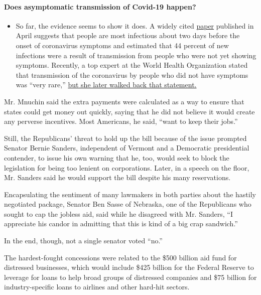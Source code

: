 \begin{itemize}
{  \paragraph{Does asymptomatic transmission of Covid-19
  happen?}\label{does-asymptomatic-transmission-of-covid-19-happen}}

  \begin{itemize}
  \tightlist
  \item
    So far, the evidence seems to show it does. A widely cited
    \href{https://www.nature.com/articles/s41591-020-0869-5}{paper}
    published in April suggests that people are most infectious about
    two days before the onset of coronavirus symptoms and estimated that
    44 percent of new infections were a result of transmission from
    people who were not yet showing symptoms. Recently, a top expert at
    the World Health Organization stated that transmission of the
    coronavirus by people who did not have symptoms was ``very rare,''
    \href{https://www.nytimes.com/2020/06/09/world/coronavirus-updates.html?action=click\&pgtype=Article\&state=default\&region=MAIN_CONTENT_3\&context=storylines_faq\#link-1f302e21}{but
    she later walked back that statement.}
  \end{itemize}
\end{itemize}

Mr. Mnuchin said the extra payments were calculated as a way to ensure
that states could get money out quickly, saying that he did not believe
it would create any perverse incentives. Most Americans, he said, ``want
to keep their jobs.''

Still, the Republicans' threat to hold up the bill because of the issue
prompted Senator Bernie Sanders, independent of Vermont and a Democratic
presidential contender, to issue his own warning that he, too, would
seek to block the legislation for being too lenient on corporations.
Later, in a speech on the floor, Mr. Sanders said he would support the
bill despite his many reservations.

Encapsulating the sentiment of many lawmakers in both parties about the
hastily negotiated package, Senator Ben Sasse of Nebraska, one of the
Republicans who sought to cap the jobless aid, said while he disagreed
with Mr. Sanders, ``I appreciate his candor in admitting that this is
kind of a big crap sandwich.''

In the end, though, not a single senator voted ``no.''

The hardest-fought concessions were related to the \$500 billion aid
fund for distressed businesses, which would include \$425 billion for
the Federal Reserve to leverage for loans to help broad groups of
distressed companies and \$75 billion for industry-specific loans to
airlines and other hard-hit sectors.

